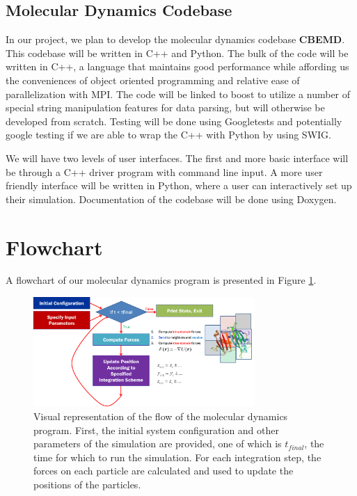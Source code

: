 \documentclass[10pt]{article}
\begin{document}
\subsection{Molecular Dynamics Codebase}
In our project, we plan to develop the molecular dynamics codebase \textbf{CBEMD}. This codebase will be written in C++ and Python. The bulk of the code will be written in C++, a language that maintains good performance while affording us the conveniences of object oriented programming and relative ease of parallelization with MPI. The code will be linked to boost to utilize a number of special string manipulation features for data parsing, but will otherwise be developed from scratch. Testing will be done using Googletests and potentially google testing if we are able to wrap the C++ with Python by using SWIG.

We will have two levels of user interfaces.  The first and more basic interface will be through a C++ driver program with command line input.  A more user friendly interface will be written in Python, where a user can interactively set up their simulation. Documentation of the codebase will be done using Doxygen.



\section{Flowchart}
A flowchart of our molecular dynamics program is presented in Figure \ref{fig:flowchart}.
\begin{figure}[h]
\centering
\includegraphics[width=0.75\textwidth]{flowchart.png}
\caption{Visual representation of the flow of the molecular dynamics program. First, the initial system configuration and other parameters of the simulation are provided, one of which is $t_{final}$, the time for which to run the simulation. For each integration step, the forces on each particle are calculated and used to update the positions of the particles.}
\label{fig:flowchart}
\end{figure}
\end{document}
